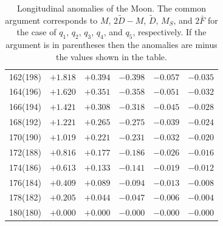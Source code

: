\begin{table}[!h]
\begin{tabular}{rrrrrr}
162(198) & $+1.818$ & $+0.394$ & $-0.398$ & $-0.057$ & $-0.035$\\
164(196) & $+1.620$ & $+0.351$ & $-0.358$ & $-0.051$ & $-0.032$\\
166(194) & $+1.421$ & $+0.308$ & $-0.318$ & $-0.045$ & $-0.028$\\
168(192) & $+1.221$ & $+0.265$ & $-0.275$ & $-0.039$ & $-0.024$\\
170(190) & $+1.019$ & $+0.221$ & $-0.231$ & $-0.032$ & $-0.020$\\
172(188) & $+0.816$ & $+0.177$ & $-0.186$ & $-0.026$ & $-0.016$\\
174(186) & $+0.613$ & $+0.133$ & $-0.141$ & $-0.019$ & $-0.012$\\
176(184) & $+0.409$ & $+0.089$ & $-0.094$ & $-0.013$ & $-0.008$\\
178(182) & $+0.205$ & $+0.044$ & $-0.047$ & $-0.006$ & $-0.004$\\ 
180(180) & $+0.000$ & $+0.000$ & $-0.000$ & $-0.000$ & $-0.000$\\
\end{tabular}
\caption{Longitudinal anomalies of the Moon. The common argument corresponds to
$M$, $2\tilde{D}-M$, $\tilde{D}$, $M_S$, and $2\bar{F}$ for the case of
$q_1$, $q_2$, $q_3$, $q_4$, and $q_5$, respectively. If the argument is
in parentheses then the anomalies are minus the values shown
in the table. }\label{tmoona}
\end{table}

